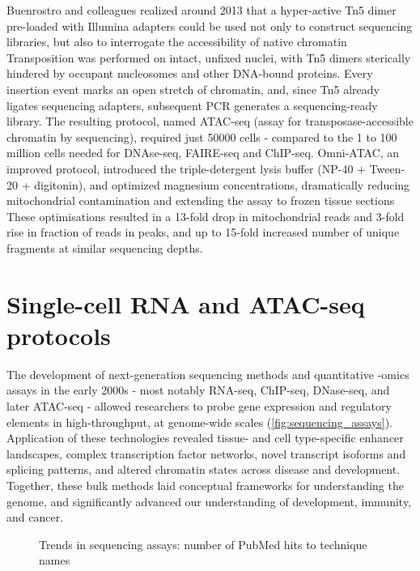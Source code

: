 Buenrostro and colleagues realized around 2013 that a hyper-active Tn5 dimer pre-loaded with Illumina adapters could be used not only to construct sequencing libraries, but also to interrogate the accessibility of native chromatin Transposition was performed on intact, unfixed nuclei, with Tn5 dimers sterically hindered by occupant nucleosomes and other DNA-bound proteins. Every insertion event marks an open stretch of chromatin, and, since Tn5 already ligates sequencing adapters, subsequent PCR generates a sequencing-ready library. The resulting protocol, named ATAC-seq (assay for transposase-accessible chromatin by sequencing), required just \num{50000} cells - compared to the 1 to 100 million cells needed for DNAse-seq, FAIRE-seq and ChIP-seq. Omni-ATAC, an improved protocol, introduced the triple-detergent lysis buffer (NP-40 + Tween-20 + digitonin), and optimized magnesium concentrations, dramatically reducing mitochondrial contamination and extending the assay to frozen tissue sections These optimisations resulted in a 13-fold drop in mitochondrial reads and 3-fold rise in fraction of reads in peaks, and up to 15-fold increased number of unique fragments at similar sequencing depths.

\section{Single-cell RNA and ATAC-seq protocols}
\label{sect:single_cell_sequencing_tech}
The development of next-generation sequencing methods and quantitative -omics assays in the early 2000s - most notably RNA-seq, ChIP-seq, DNase-seq, and later ATAC-seq - allowed researchers to probe gene expression and regulatory elements in high-throughput, at genome-wide scales (\autoref{fig:sequencing_assays}). Application of these technologies revealed tissue- and cell type-specific enhancer landscapes, complex transcription factor networks, novel transcript isoforms and splicing patterns, and altered chromatin states across disease and development. Together, these bulk methods laid conceptual frameworks for understanding the genome, and significantly advanced our understanding of development, immunity, and cancer.

\begin{figure}[ht]
	\centering
	
	\caption[Trends in sequencing assays]{Trends in sequencing assays: number of PubMed hits to technique names}
	\label{fig:sequencing_assays}
\end{figure}

